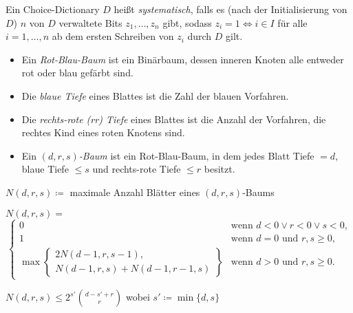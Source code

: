 \documentclass{cheat-sheet}
\begin{document}

\begin{defn}
  Ein Choice-Dictionary $D$ heißt \emph{systematisch}, falls es (nach der Initialisierung von $D$) $n$ von $D$ verwaltete Bits $z_1, \ldots, z_n$ gibt, sodass $z_i = 1 \iff i \in I$ für alle $i = 1, \ldots, n$ ab dem ersten Schreiben von $z_i$ durch $D$ gilt.
\end{defn}

\begin{defn}
  \begin{itemize}
    \item Ein \emph{Rot-Blau-Baum} ist ein Binärbaum, dessen inneren Knoten alle entweder rot oder blau gefärbt sind.
    \item Die \emph{blaue Tiefe} eines Blattes ist die Zahl der blauen Vorfahren.
    \item Die \emph{rechts-rote (rr) Tiefe} eines Blattes ist die Anzahl der Vorfahren, die rechtes Kind eines roten Knotens sind.
    \item Ein \emph{$(d, r, s)$-Baum} ist ein Rot-Blau-Baum, in dem jedes Blatt Tiefe $= d$, blaue Tiefe $\leq s$ und rechts-rote Tiefe $\leq r$ besitzt.
  \end{itemize}
\end{defn}

\begin{nota}
  $N(d, r, s) \coloneqq$ maximale Anzahl Blätter eines $(d, r, s)$-Baums
\end{nota}

\begin{lem}
  $N(d, r, s) =$
  \[
    \begin{cases}
      0 & \text{wenn $d < 0 \vee r < 0 \vee s < 0$,} \\
      1 & \text{wenn $d = 0$ und $r, s \geq 0$,} \\
      \max \left\{
        \begin{array}{l}
          2 N(d-1, r, s-1), \\
          N(d{-}1, r, s) + N(d{-}1, r{-}1, s)
        \end{array}
      \right\} & \text{wenn $d > 0$ und $r, s \geq 0$.}
    \end{cases}
  \]
\end{lem}

\begin{lem}
  $N(d, r, s) \leq 2^{s'} \binom{d - s' + r}{r}$ \enspace
  wobei $s' \coloneqq \min \{ d, s \}$
\end{lem}
\end{document}
